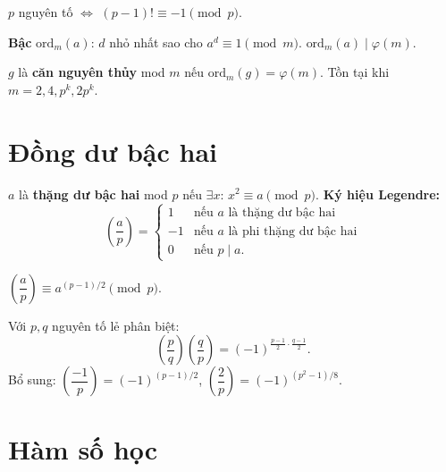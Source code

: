 \documentclass[12pt,a4paper]{article}
\begin{document}
\begin{dinhly}[title={Wilson}]
  $p$ nguyên tố $\Leftrightarrow$ $(p-1)! \equiv -1 \pmod{p}$.
\end{dinhly}

\begin{dinhnghia}[title={Bậc và căn nguyên thủy}]
  \textbf{Bậc} $\text{ord}_m(a)$: $d$ nhỏ nhất sao cho $a^d \equiv 1 \pmod{m}$. $\text{ord}_m(a) \mid \varphi(m)$.

  $g$ là \textbf{căn nguyên thủy} mod $m$ nếu $\text{ord}_m(g) = \varphi(m)$. Tồn tại khi $m = 2, 4, p^k, 2p^k$.
\end{dinhnghia}

\section{Đồng dư bậc hai}

\begin{dinhnghia}[title={Thặng dư bậc hai}]
  $a$ là \textbf{thặng dư bậc hai} mod $p$ nếu $\exists x$: $x^2 \equiv a \pmod{p}$. \textbf{Ký hiệu Legendre:}
  \[
    \left(\frac{a}{p}\right) = \begin{cases} 1 & \text{nếu } a \text{ là thặng dư bậc hai} \\ -1 & \text{nếu } a \text{ là phi thặng dư bậc hai} \\ 0 & \text{nếu } p \mid a. \end{cases}
  \]
\end{dinhnghia}

\begin{dinhly}[title={Tiêu chuẩn Euler}]
  $\left(\dfrac{a}{p}\right) \equiv a^{(p-1)/2} \pmod{p}$.
\end{dinhly}

\begin{dinhly}[title={Luật thuận nghịch bậc hai (Gauss)}]
  Với $p, q$ nguyên tố lẻ phân biệt:
  \[
    \left(\frac{p}{q}\right)\left(\frac{q}{p}\right) = (-1)^{\frac{p-1}{2}\cdot\frac{q-1}{2}}.
  \]
  Bổ sung: $\left(\dfrac{-1}{p}\right) = (-1)^{(p-1)/2}$, \;$\left(\dfrac{2}{p}\right) = (-1)^{(p^2-1)/8}$.
\end{dinhly}

\section{Hàm số học}
\end{document}
